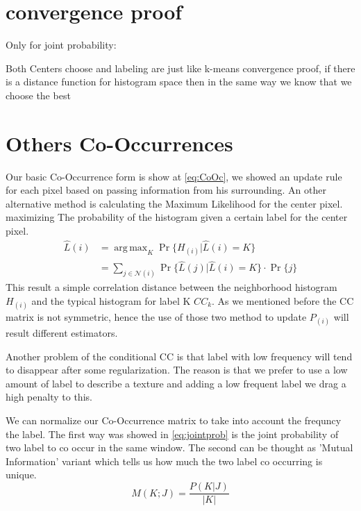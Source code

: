 \documentclass{article}
\DeclareMathOperator*{\argmax}{arg\,max}
\begin{document}
\section{convergence proof}
Only for joint probability:

Both Centers choose and labeling are just like k-means convergence proof, if there is a distance function for histogram space then in the same way we know that we choose the best 

\section{Others Co-Occurrences}

Our basic Co-Occurrence form is show at \eqref{eq:CoOc}, we showed an update rule for each pixel based on passing information from his surrounding.
An other alternative method is calculating the Maximum Likelihood for the center pixel. maximizing The probability of the histogram given a certain label for the center pixel.
\begin{align}
\hat{L}(i)&=\argmax_K \Pr \{H_{(i)}|\hat{L}(i)=K \}\\
&=\sum_{j\in\mathcal{N}(i)}^{} \Pr \{\hat{L}(j)|\hat{L}(i)=K \}\cdot \Pr \{j\}\nonumber
\end{align}
This result a simple correlation distance between the neighborhood histogram $ H_{(i)} $ and the typical histogram for label K $ CC_k $.
As we mentioned before the CC matrix is not symmetric, hence the use of those two method to update $ P_{(i)} $ will result different estimators.

Another problem of the conditional CC is that label with low frequency will tend to disappear after some regularization. The reason is that we prefer to use a low amount of label to describe a texture and adding a low frequent label we drag a high penalty to this.

We can normalize our Co-Occurrence matrix to take into account the frequncy the label.
The first way was showed in \eqref{eq:jointprob} is the joint probability of two label to co occur in the same window.
The second can be thought as 'Mutual Information' variant which tells us how much the two label co occurring is unique.
\begin{equation}
M(K;J)=\dfrac{P(K|J)}{|K|}
\end{equation} 






\end{document}

